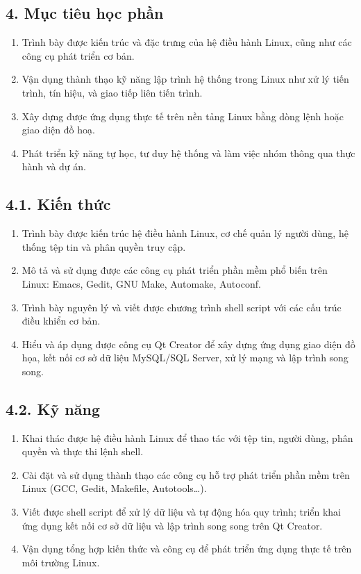 \documentclass[a4paper,13pt]{article}
\begin{document}
\subsection*{4. Mục tiêu học phần}
\begin{enumerate}[label=4.\arabic*.]
    \item Trình bày được kiến trúc và đặc trưng của hệ điều hành Linux, cũng như các công cụ phát triển cơ bản.
    \item Vận dụng thành thạo kỹ năng lập trình hệ thống trong Linux như xử lý tiến trình, tín hiệu, và giao tiếp liên tiến trình.
    \item Xây dựng được ứng dụng thực tế trên nền tảng Linux bằng dòng lệnh hoặc giao diện đồ hoạ.
    \item Phát triển kỹ năng tự học, tư duy hệ thống và làm việc nhóm thông qua thực hành và dự án.
\end{enumerate}

\subsection*{4.1. Kiến thức}
\begin{enumerate}[label=4.1.\arabic*.]
    \item Trình bày được kiến trúc hệ điều hành Linux, cơ chế quản lý người dùng, hệ thống tệp tin và phân quyền truy cập.
    \item Mô tả và sử dụng được các công cụ phát triển phần mềm phổ biến trên Linux: Emacs, Gedit, GNU Make, Automake, Autoconf.
    \item Trình bày nguyên lý và viết được chương trình shell script với các cấu trúc điều khiển cơ bản.
    \item Hiểu và áp dụng được công cụ Qt Creator để xây dựng ứng dụng giao diện đồ họa, kết nối cơ sở dữ liệu MySQL/SQL Server, xử lý mạng và lập trình song song.
\end{enumerate}

\subsection*{4.2. Kỹ năng}
\begin{enumerate}[label=4.2.\arabic*.]
    \item Khai thác được hệ điều hành Linux để thao tác với tệp tin, người dùng, phân quyền và thực thi lệnh shell.
    \item Cài đặt và sử dụng thành thạo các công cụ hỗ trợ phát triển phần mềm trên Linux (GCC, Gedit, Makefile, Autotools…).
    \item Viết được shell script để xử lý dữ liệu và tự động hóa quy trình; triển khai ứng dụng kết nối cơ sở dữ liệu và lập trình song song trên Qt Creator.
    \item Vận dụng tổng hợp kiến thức và công cụ để phát triển ứng dụng thực tế trên môi trường Linux.
\end{enumerate}
\end{document}
